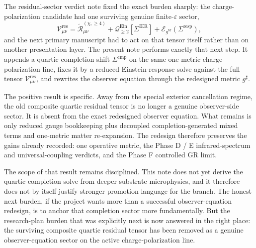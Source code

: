 \documentclass[11pt]{article}
\newcommand{\ObserverMetric}{g^{\mathrm{br}}}
\newcommand{\CompletedMetric}{g^{\sharp}}
\newcommand{\BaseShift}{\Sigma^{\mathrm{IER}}}
\newcommand{\ResponseShift}{\Sigma^{\mathrm{resp}}}
\newcommand{\CompShift}{\Sigma^{\mathrm{cmp}}}
\newcommand{\ReLongFour}{\widetilde{\mathcal R}_{\mu\nu}^{(\chi,\ge 4)}}
\newcommand{\EinLin}{\mathcal E_{\ObserverMetric}}
\newcommand{\EinQuad}{\mathcal Q_{\ge 2}^{\mathrm{Ein}}}
\newcommand{\ResidualCore}{\mathcal V_{\mu\nu}^{\mathrm{res}}}
\newcommand{\epsIR}{\varepsilon}
\begin{document}
The residual-sector verdict note fixed the exact burden sharply: the charge-polarization candidate had one surviving genuine finite-\(\epsIR\) sector,
\[
\ResidualCore
=
\ReLongFour
+\EinQuad[\BaseShift]
+\EinLin(\ResponseShift),
\]
and the next primary manuscript had to act on that tensor itself rather than on another presentation layer. The present note performs exactly that next step. It appends a quartic-completion shift \(\CompShift\) on the same one-metric charge-polarization line, fixes it by a reduced Einstein-response solve against the full tensor \(\ResidualCore\), and rewrites the observer equation through the redesigned metric \(\CompletedMetric\).

The positive result is specific. Away from the special exterior cancellation regime, the old composite quartic residual tensor is no longer a genuine observer-side sector. It is absent from the exact redesigned observer equation. What remains is only reduced gauge bookkeeping plus decoupled completion-generated mixed terms and one-metric matter re-expansion. The redesign therefore preserves the gains already recorded: one operative metric, the Phase D / E infrared-spectrum and universal-coupling verdicts, and the Phase F controlled GR limit.

The scope of that result remains disciplined. This note does not yet derive the quartic-completion solve from deeper substrate microphysics, and it therefore does not by itself justify stronger promotion language for the branch. The honest next burden, if the project wants more than a successful observer-equation redesign, is to anchor that completion sector more fundamentally. But the research-plan burden that was explicitly next is now answered in the right place: the surviving composite quartic residual tensor has been removed as a genuine observer-equation sector on the active charge-polarization line.
\end{document}
